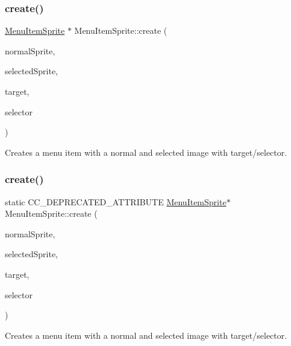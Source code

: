 \subsubsection{\texorpdfstring{create()}{create()}\hspace{0.1cm}{\footnotesize\ttfamily [3/10]}}
{\footnotesize\ttfamily \hyperlink{classMenuItemSprite}{Menu\+Item\+Sprite} $\ast$ Menu\+Item\+Sprite\+::create (\begin{DoxyParamCaption}\item[{\hyperlink{classNode}{Node} $\ast$}]{normal\+Sprite,  }\item[{\hyperlink{classNode}{Node} $\ast$}]{selected\+Sprite,  }\item[{\hyperlink{classRef}{Ref} $\ast$}]{target,  }\item[{S\+E\+L\+\_\+\+Menu\+Handler}]{selector }\end{DoxyParamCaption})\hspace{0.3cm}{\ttfamily [static]}}

Creates a menu item with a normal and selected image with target/selector. \mbox{\label{classMenuItemSprite_a45379baaef4691f9508d5e96374dba5d}} 
\subsubsection{\texorpdfstring{create()}{create()}\hspace{0.1cm}{\footnotesize\ttfamily [4/10]}}
{\footnotesize\ttfamily static C\+C\+\_\+\+D\+E\+P\+R\+E\+C\+A\+T\+E\+D\+\_\+\+A\+T\+T\+R\+I\+B\+U\+TE \hyperlink{classMenuItemSprite}{Menu\+Item\+Sprite}$\ast$ Menu\+Item\+Sprite\+::create (\begin{DoxyParamCaption}\item[{\hyperlink{classNode}{Node} $\ast$}]{normal\+Sprite,  }\item[{\hyperlink{classNode}{Node} $\ast$}]{selected\+Sprite,  }\item[{\hyperlink{classRef}{Ref} $\ast$}]{target,  }\item[{S\+E\+L\+\_\+\+Menu\+Handler}]{selector }\end{DoxyParamCaption})\hspace{0.3cm}{\ttfamily [static]}}

Creates a menu item with a normal and selected image with target/selector. \mbox{\label{classMenuItemSprite_ab8917eb41cd1e3c545d6585d4454ef6b}} 
